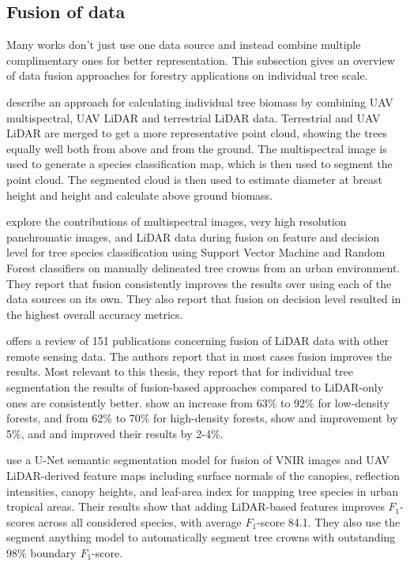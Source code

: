 \subsection{Fusion of data}

Many works don't just use one data source and instead combine multiple complimentary ones for better representation.
This subsection gives an overview of data fusion approaches for forestry applications on individual tree scale.

\citet{lianBiomassCalculationsIndividual2022} describe an approach for calculating individual tree biomass by combining UAV multispectral, UAV LiDAR and terrestrial LiDAR data.
Terrestrial and UAV LiDAR are merged to get a more representative point cloud, showing the trees equally well both from above and from the ground.
The multispectral image is used to generate a species classification map, which is then used to segment the point cloud.
The segmented cloud is then used to estimate diameter at breast height and height and calculate above ground biomass.

\citet{liFusionApproachesIndividual2023} explore the contributions of multispectral images, very high resolution panchromatic images, and LiDAR data during fusion on feature and decision level for tree species classification using Support Vector Machine and Random Forest classifiers on manually delineated tree crowns from an urban environment.
They report that fusion consistently improves the results over using each of the data sources on its own.
They also report that fusion on decision level resulted in the highest overall accuracy metrics.

\citet{balestraLiDARDataFusion2024} offers a review of 151 publications concerning fusion of LiDAR data with other remote sensing data.
The authors report that in most cases fusion improves the results.
Most relevant to this thesis, they report that for individual tree segmentation the results of fusion-based approaches compared to LiDAR-only ones are consistently better.
\citet{laExtractionIndividualTree2015} show an increase from 63\% to 92\% for low-density forests, and from 62\% to 70\% for high-density forests, \citet{aubry-kientzMultisensorDataFusion2021} show and improvement by 5\%, and \citet{zhenImpactTreeOrientedGrowth2014} and \citet{arenas-corralizaAutomaticMappingTree2020} improved their results by 2-4\%.

\citet{ferreiraImprovingUrbanTree2024} use a U-Net semantic segmentation model for fusion of VNIR images and UAV LiDAR-derived feature maps including surface normals of the canopies, reflection intensities, canopy heights, and leaf-area index for mapping tree species in urban tropical areas.
Their results show that adding LiDAR-based features improves $F_1$-scores across all considered species, with average $F_1$-score 84.1.
They also use the segment anything model \citep{Kirillov_2023_ICCV} to automatically segment tree crowns with outstanding 98\% boundary $F_1$-score.

